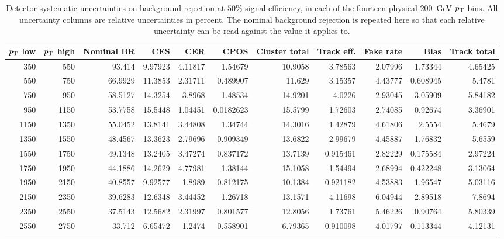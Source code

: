 \begin{landscape}
\begin{table}[p]
\centering
\footnotesize
\setlength{\tabcolsep}{4pt}
\caption{Detector systematic uncertainties on background rejection at $50\%$ signal efficiency, in each of the fourteen physical $200$~GeV $p_{\mathrm{T}}$ bins. All uncertainty columns are relative uncertainties in percent. The nominal background rejection is repeated here so that each relative uncertainty can be read against the value it applies to.}
\label{tab:supp-syst-detector}
\begin{tabular}{rrr rrrr rrrr}
\toprule
$p_{\mathrm{T}}$ low & $p_{\mathrm{T}}$ high & Nominal BR & CES & CER & CPOS & Cluster total & Track eff. & Fake rate & Bias & Track total \\
\midrule
350 & 550 & 93.414 & 9.97923 & 4.11817 & 1.54679 & 10.9058 & 3.78563 & 2.07996 & 1.73344 & 4.65425 \\
550 & 750 & 66.9929 & 11.3853 & 2.31711 & 0.489907 & 11.629 & 3.15357 & 4.43777 & 0.608945 & 5.4781 \\
750 & 950 & 58.5127 & 14.3254 & 3.8968 & 1.48534 & 14.9201 & 4.0226 & 2.93045 & 3.05909 & 5.84182 \\
950 & 1150 & 53.7758 & 15.5448 & 1.04451 & 0.0182623 & 15.5799 & 1.72603 & 2.74085 & 0.92674 & 3.36901 \\
1150 & 1350 & 55.0452 & 13.8141 & 3.44808 & 1.34744 & 14.3016 & 1.42879 & 4.61806 & 2.5554 & 5.4679 \\
1350 & 1550 & 48.4567 & 13.3623 & 2.79696 & 0.909349 & 13.6822 & 2.99679 & 4.45887 & 1.76832 & 5.6559 \\
1550 & 1750 & 49.1348 & 13.2405 & 3.47274 & 0.837172 & 13.7139 & 0.915461 & 2.82229 & 0.175584 & 2.97224 \\
1750 & 1950 & 44.1886 & 14.2629 & 4.77981 & 1.38144 & 15.1058 & 1.54494 & 2.68994 & 0.422248 & 3.13064 \\
1950 & 2150 & 40.8557 & 9.92577 & 1.8989 & 0.812175 & 10.1384 & 0.921182 & 4.53883 & 1.96547 & 5.03116 \\
2150 & 2350 & 39.6283 & 12.6348 & 3.44452 & 1.26718 & 13.1571 & 4.11698 & 6.04944 & 2.89518 & 7.8694 \\
2350 & 2550 & 37.5143 & 12.5682 & 2.31997 & 0.801577 & 12.8056 & 1.73761 & 5.46226 & 0.90764 & 5.80339 \\
2550 & 2750 & 33.712 & 6.65472 & 1.2474 & 0.558901 & 6.79365 & 0.910098 & 4.01797 & 0.113344 & 4.12131 \\

\end{tabular}
\end{table}
\end{landscape}
